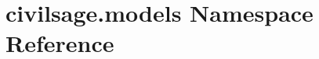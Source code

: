 \hypertarget{namespacecivilsage_1_1models}{}\section{civilsage.\+models Namespace Reference}
\label{namespacecivilsage_1_1models}

